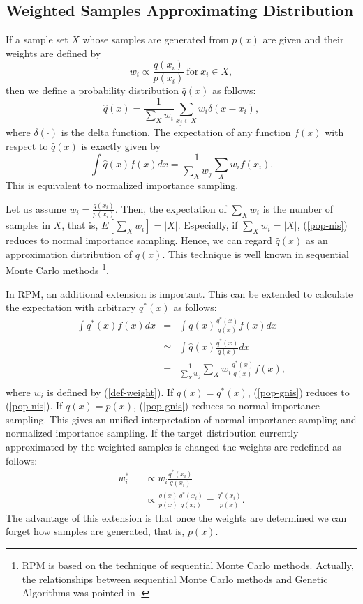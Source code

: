 \subsection{Weighted Samples Approximating Distribution}
\label{sec-gis}
If a sample set $X$ whose samples are generated from $p(x)$ are given
and their weights are defined by 
\begin{equation}
 w_i \propto \frac{q(x_i)}{p(x_i)} \ \mathrm{for} \ x_i \in X, \label{def-weight}
\end{equation}
then
we define a probability distribution $\hat q(x)$ as follows:
\begin{equation}
 \hat q(x)= \frac{1}{\sum_{X} w_i}\sum_{x_j \in X} w_i \delta(x-x_i),
\label{particle-distribution}
\end{equation}
where $\delta(\cdot)$ is the delta function.
The expectation of any function $f(x)$ 
with respect to $\hat q(x)$ is exactly given by
\begin{equation}
 \int \hat q(x) f(x) dx = \frac{1}{\sum_X w_j}\sum_X w_i f(x_i).\label{pop-nis}
\end{equation}
This is equivalent to normalized importance sampling.

Let us assume $w_i=\frac{q(x_i)}{p(x_i)}$.
Then, the expectation of $\sum_X w_i$ is the number of samples in $X$,
that is, $E[\sum_X w_i]=|X|$.
Especially,
if $\sum_X w_i=|X|$, (\ref{pop-nis}) reduces to normal importance sampling.
Hence, we can regard $\hat q(x)$ as
an approximation distribution of $q(x)$.
This technique is well known 
in sequential Monte Carlo methods \cite{doucet:particle}
\footnote{
RPM is based on the technique of sequential Monte Carlo methods.
Actually, the relationships between sequential Monte Carlo methods and 
Genetic Algorithms was pointed in \cite{higuchi:ga-pf}.
}.

In RPM, an additional extension is important.
This can be extended to calculate the expectation with
arbitrary $q^* (x)$ as follows:
\begin{eqnarray}
\int q^*(x) f(x) dx &=& \int q(x) \frac{q^*(x)}{q(x)} f(x)dx\\
                    &\simeq& \int \hat q(x) \frac{q^*(x)}{q(x)} dx\\
                    &=& \frac{1}{\sum_X w_j} \sum_X w_i
		     \frac{q^*(x)}{q(x)} f(x), \label{pop-gnis}\nonumber \\
\end{eqnarray}
where $w_i$ is defined by (\ref{def-weight}).
If $q(x)=q^*(x)$, (\ref{pop-gnis}) reduces to (\ref{pop-nis}).
If $q(x)=p(x)$, (\ref{pop-gnis}) reduces to normal importance sampling.
This gives an unified interpretation of normal importance sampling and
normalized importance sampling.
If the target distribution currently approximated by the
weighted samples is changed
the weights are redefined as follows:
\begin{eqnarray}
 w^*_i && \propto  w_i \frac{q^*(x_i)}{q(x_i)} \label{weight-shift} \\
 &&  \propto     
\frac{q(x)}{p(x)}
\frac{q^*(x_i)}{q(x_i)}=\frac{q^*(x_i)}{p(x)}.  \nonumber
\end{eqnarray}
The advantage of this extension is that
once the weights are determined 
we can forget how samples are generated,
that is, $p(x)$.


